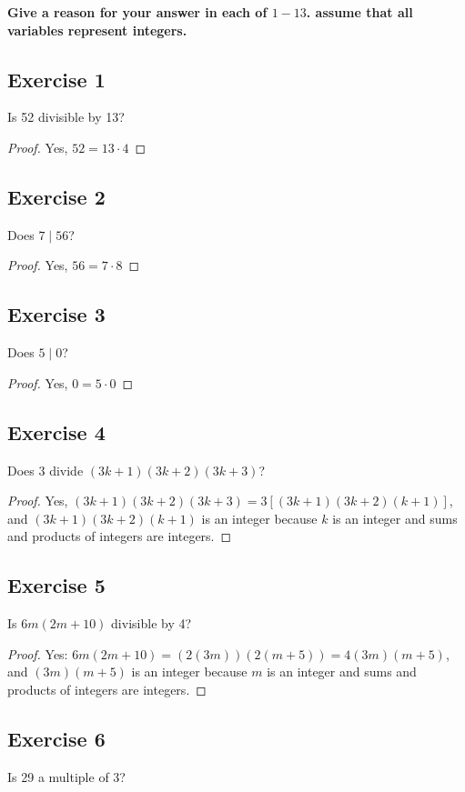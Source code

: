 \documentclass[14pt]{extarticle}
\newcommand{\cy}{\color{cyan}}
\begin{document}
{\bf \cy Give a reason for your answer in each of $1-13$. assume that all variables represent integers.}

\subsection{Exercise 1}
Is 52 divisible by 13?

\begin{proof}
Yes, $52 = 13 \cdot 4$
\end{proof}

\subsection{Exercise 2}
Does $7 \mid 56$?

\begin{proof}
Yes, $56 = 7 \cdot 8$
\end{proof}

\subsection{Exercise 3}
Does $5 \mid 0$?

\begin{proof}
Yes, $0 = 5 \cdot 0$
\end{proof}

\subsection{Exercise 4}
Does 3 divide $(3k + 1)(3k + 2)(3k + 3)$?

\begin{proof}
Yes, $(3k + 1)(3k + 2)(3k + 3) = 3[(3k + 1)(3k + 2)
(k + 1)]$, and $(3k + 1)(3k + 2)(k + 1)$ is an integer because $k$ is an integer and sums and products of integers
are integers.
\end{proof}

\subsection{Exercise 5}
Is $6m(2m + 10)$ divisible by 4?

\begin{proof}
Yes: $6m(2m + 10) = (2(3m))(2(m + 5)) = 4(3m)(m + 5)$, and $(3m)(m + 5)$ is an integer because $m$ is an integer and sums and products of integers are integers.
\end{proof}

\subsection{Exercise 6}
Is 29 a multiple of 3?
\end{document}
